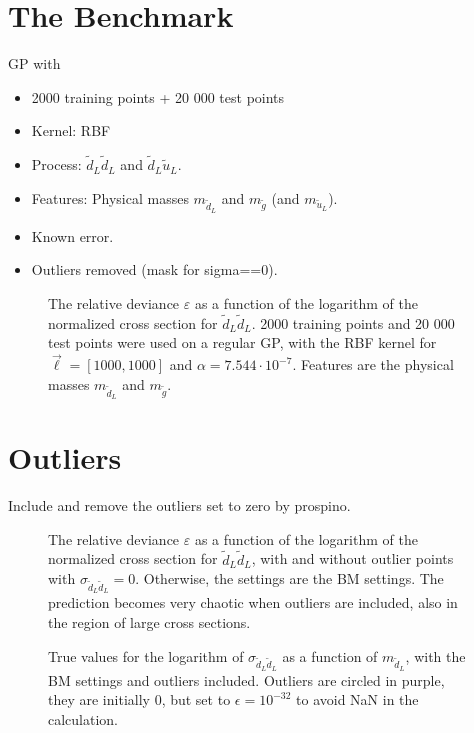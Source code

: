 \documentclass[twoside,english]{uiofysmaster}
\begin{document}
\section{The Benchmark}

GP with 
\begin{itemize}
\item 2000 training points + 20 000 test points
\item Kernel: RBF
\item Process: $\tilde{d}_L \tilde{d}_L$ and $\tilde{d}_L \tilde{u}_L$.
\item Features: Physical masses $m_{\tilde{d}_L}$ and $m_{\tilde{g}}$ (and $m_{\tilde{u}_L}$).
\item Known error.
\item Outliers removed (mask for sigma==0).
\end{itemize}

\begin{figure}[H]
\centering
\caption{The relative deviance $\varepsilon$ as a function of the logarithm of the normalized cross section for $\tilde{d}_L \tilde{d}_L$. 2000 training points and 20 000 test points were used on a regular GP, with the RBF kernel for $\vec{\ell} = [1000, 1000]$ and $\alpha= 7.544 \cdot 10^{-7}$. Features are the physical masses $m_{\tilde{d}_L}$ and $m_{\tilde{g}}$.}
\end{figure}

\section{Outliers}

Include and remove the outliers set to zero by prospino.

\begin{figure}[H]
\centering
\caption{The relative deviance $\varepsilon$ as a function of the logarithm of the normalized cross section for $\tilde{d}_L \tilde{d}_L$, with and without outlier points with $\sigma_{\tilde{d}_L \tilde{d}_L} = 0$. Otherwise, the settings are the BM settings. The prediction becomes very chaotic when outliers are included, also in the region of large cross sections.}
\end{figure}

\begin{figure}[H]
\caption{True values for the logarithm of $\sigma_{\tilde{d}_L \tilde{d}_L}$ as a function of $m_{\tilde{d}_L}$, with the BM settings and outliers included. Outliers are circled in purple, they are initially $0$, but set to $\epsilon = 10^{-32}$ to avoid NaN in the calculation.}
\label{Fig:: evaluating cross : sigma mq true with outliers}
\end{figure}
\end{document}

